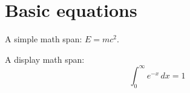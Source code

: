 \documentclass{article}
\begin{document}
\section{Basic equations}

A simple math span: $E = mc^2$.

A display math span:
\[ \int_0^{\infty} e^{-x} \, dx = 1 \]
\end{document}
